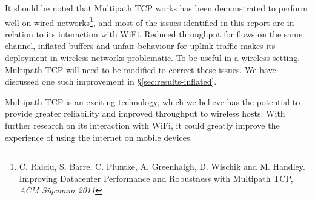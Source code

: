 It should be noted that Multipath TCP works has been demonstrated to perform
well on wired networks\footnote{C. Raiciu, S. Barre, C. Pluntke, A. Greenhalgh, 
D. Wischik and M. Handley. Improving Datacenter Performance and Robustness with 
Multipath TCP, \textit{ACM Sigcomm 2011}}, and most of the issues identified
in this report are in relation to its interaction with WiFi. Reduced throughput
for flows on the same channel, inflated buffers and unfair behaviour for uplink
traffic makes its deployment in wireless networks problematic. To be useful in a
wireless setting, Multipath TCP will need to be modified to correct these issues.
We have discussed one such improvement in
\S\ref{sec:results-inflated}.

Multipath TCP is an exciting technology, which we believe has the potential to 
provide greater reliability and improved throughput to wireless hosts. With
further research on its interaction with WiFi, it could greatly improve the
experience of using the internet on mobile devices.

